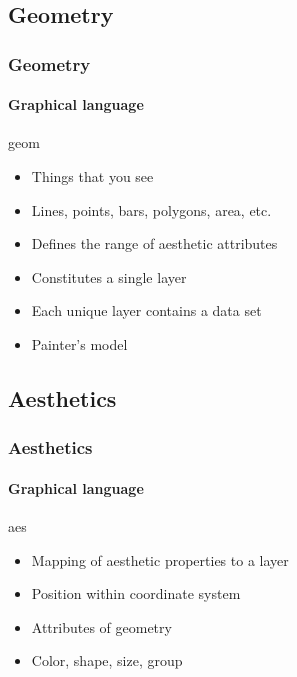 \documentclass{beamer}
\begin{document}
\subsection{Geometry}
\begin{frame}\frametitle{Geometry}
\framesubtitle{Graphical language}
	\begin{alertblock}{geom}
	\begin{itemize}
		\item Things that you see
		\item Lines, points, bars, polygons, area, etc.
		\item Defines the range of aesthetic attributes
		\item Constitutes a single layer
		\item Each unique layer contains a data set
		\item Painter's model
	\end{itemize}
	\end{alertblock}
	\end{frame}

\subsection{Aesthetics}
\begin{frame}\frametitle{Aesthetics}
\framesubtitle{Graphical language}
	\begin{exampleblock}{aes}
		\begin{itemize}
			\item \alert{Mapping} of aesthetic properties to a layer 
			\item Position within coordinate system
			\item Attributes of geometry 
			\item Color, shape, size, group
		\end{itemize}
	\end{exampleblock}
\end{frame}
\end{document}
